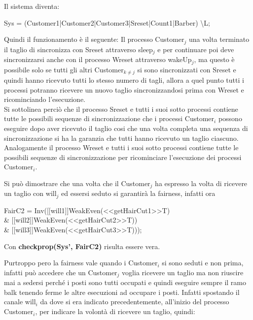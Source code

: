 Il sistema diventa:

\textsf{Sys = (Customer1|Customer2|Customer3|Sreset|Count1|Barber) \textbackslash L;}

Quindi il funzionamento è il seguente:
Il processo \textsf{Customer$_{j}$} una volta terminato il taglio di sincronizza con \textsf{Sreset} attraverso \textsf{sleep$_{j}$} e per continuare poi deve sincronizzarsi anche con il processo \textsf{Wreset} attraverso \textsf{wakeUp$_{j}$}, ma questo è possibile solo se tutti gli altri \textsf{Customer$_{k\not=j}$} si sono sincronizzati con \textsf{Sreset} e quindi hanno ricevuto tutti lo stesso numero di tagli, allora a quel punto tutti i processi potranno ricevere un nuovo taglio sincronizzandosi prima con \textsf{Wreset} e ricominciando l'esecuzione.\\
Si sottolinea perciò che il processo \textsf{Sreset} e tutti i suoi sotto processi contiene tutte le possibili sequenze di sincronizzazione che i processi \textsf{Customer$_{i}$} possono eseguire dopo aver ricevuto il taglio cosi che una volta completa una sequenza di sincronizzazione si ha la garanzia che tutti hanno ricevuto un taglio ciascuno. Analogamente il processo \textsf{Wreset} e tutti i suoi sotto processi contiene tutte le possibili sequenze di sincronizzazione per ricominciare l'esecuzione dei processi \textsf{Customer$_{i}$}.

Si può dimostrare che una volta che il \textsf{Customer$_{j}$} ha espresso la volta di ricevere un taglio con \textsf{will$_{j}$} ed essersi seduto si garantirà la fairness, infatti ora

\begin{center}
	\textsf{FairC2 = Inv([[will1]]WeakEven(<<getHairCut1>>T) \\\& [[will2]]WeakEven(<<getHairCut2>>T)) \\\& [[will3]]WeakEven(<<getHairCut3>>T)));}
\end{center}

Con \textbf{checkprop(Sys', FairC2)} risulta essere vera.

Purtroppo pero la fairness vale quando i \textsf{Customer$_{i}$} si sono seduti e non prima, infatti può accedere che un \textsf{Customer$_{j}$} voglia ricevere un taglio ma non riuscire mai a sedersi perché i posti sono tutti occupati e quindi eseguire sempre il ramo \textsf{balk} tenendo ferme le altre esecuzioni ad occupare i posti. Infatti spostando il canale \textsf{will$_{i}$} da dove si era indicato precedentemente, all'inizio del processo \textsf{Customer$_{i}$}, per indicare la volontà di ricevere un taglio, quindi: 

